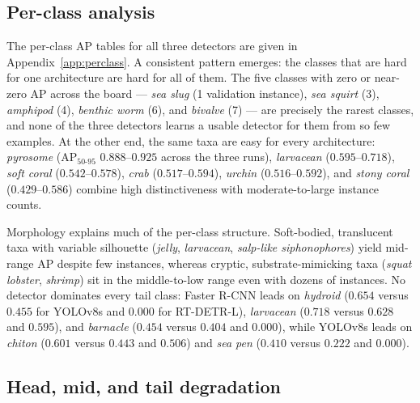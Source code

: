 \documentclass[11pt,a4paper,twocolumn]{article}
\begin{document}
\subsection{Per-class analysis}
\label{sec:results-perclass}

The per-class AP tables for all three detectors are given in Appendix~\ref{app:perclass}. A consistent pattern emerges: the classes that are hard for one architecture are hard for all of them. The five classes with zero or near-zero AP across the board --- \textit{sea slug} (1 validation instance), \textit{sea squirt} (3), \textit{amphipod} (4), \textit{benthic worm} (6), and \textit{bivalve} (7) --- are precisely the rarest classes, and none of the three detectors learns a usable detector for them from so few examples. At the other end, the same taxa are easy for every architecture: \textit{pyrosome} (AP$_{50\text{-}95}$ $0.888$--$0.925$ across the three runs), \textit{larvacean} ($0.595$--$0.718$), \textit{soft coral} ($0.542$--$0.578$), \textit{crab} ($0.517$--$0.594$), \textit{urchin} ($0.516$--$0.592$), and \textit{stony coral} ($0.429$--$0.586$) combine high distinctiveness with moderate-to-large instance counts.

Morphology explains much of the per-class structure. Soft-bodied, translucent taxa with variable silhouette (\textit{jelly}, \textit{larvacean}, \textit{salp-like siphonophores}) yield mid-range AP despite few instances, whereas cryptic, substrate-mimicking taxa (\textit{squat lobster}, \textit{shrimp}) sit in the middle-to-low range even with dozens of instances. No detector dominates every tail class: Faster R-CNN leads on \textit{hydroid} ($0.654$ versus $0.455$ for YOLOv8s and $0.000$ for RT-DETR-L), \textit{larvacean} ($0.718$ versus $0.628$ and $0.595$), and \textit{barnacle} ($0.454$ versus $0.404$ and $0.000$), while YOLOv8s leads on \textit{chiton} ($0.601$ versus $0.443$ and $0.506$) and \textit{sea pen} ($0.410$ versus $0.222$ and $0.000$).

\subsection{Head, mid, and tail degradation}
\label{sec:results-headmidtail}
\end{document}
